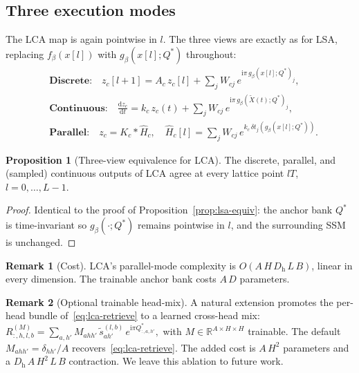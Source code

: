 \documentclass[11pt]{article}
\newcommand{\R}{\mathbb{R}}
\newcommand{\im}{\mathrm{i}}
\newcommand{\dd}{\mathrm{d}}
\newcommand{\nh}{H}              %
\newcommand{\Dh}{D_{\mathrm{h}}} %
\theoremstyle{definition}
\newtheorem{proposition}{Proposition}
\newtheorem{remark}{Remark}
\begin{document}
\subsection{Three execution modes}

The LCA map is again pointwise in $l$. The three views are exactly as
for LSA, replacing $f_\beta(x[l])$ with $g_\beta(x[l]; Q^{*})$
throughout:
\begin{align}
  &\textbf{Discrete:} \quad
    z_c[l+1] = A_c\,z_c[l] + \sum_j W_{cj}\,
      e^{\im\pi\,g_\beta(x[l]; Q^{*})_j},
       \label{eq:lca-discrete} \\
  &\textbf{Continuous:} \quad
    \frac{\dd z_c}{\dd t} = k_c\,z_c(t) + \sum_j W_{cj}\,
      e^{\im\pi\,g_\beta(\tilde X(t); Q^{*})_j},
       \label{eq:lca-continuous} \\
  &\textbf{Parallel:} \quad
    z_c = K_c * \hat H_c,
    \quad \hat H_c[l] = \sum_j W_{cj}\,
      e^{k_c\,\delta t_j(g_\beta(x[l]; Q^{*}))}.
       \label{eq:lca-parallel}
\end{align}

\begin{proposition}[Three-view equivalence for LCA]\label{prop:lca-equiv}
The discrete, parallel, and (sampled) continuous outputs of LCA agree
at every lattice point $l T$, $l = 0,\dots,L-1$.
\end{proposition}

\begin{proof}
Identical to the proof of Proposition~\ref{prop:lsa-equiv}: the anchor
bank $Q^{*}$ is time-invariant so $g_\beta(\cdot; Q^{*})$ remains
pointwise in $l$, and the surrounding SSM is unchanged.
\end{proof}

\begin{remark}[Cost]
LCA's parallel-mode complexity is $O(A\,\nh\,\Dh\,L\,B)$, linear in
every dimension. The trainable anchor bank costs $A\,D$ parameters.
\end{remark}

\begin{remark}[Optional trainable head-mix]\label{rem:lca-trainable-mix}
A natural extension promotes the per-head bundle
of~\eqref{eq:lca-retrieve} to a learned cross-head mix:
\(
  R^{(M)}_{:,h,l,b}
  = \sum_{a, h'} M_{a h h'}\,\tilde s_{a h'}^{(l,b)}\,e^{\im\pi Q^{*}_{:,a,h'}},
\)
with $M\in\R^{A\times \nh\times \nh}$ trainable. The default $M_{a h h'}
= \delta_{h h'}/A$ recovers~\eqref{eq:lca-retrieve}. The added cost is
$A\,\nh^2$ parameters and a $\Dh\,A\,\nh^2\,L\,B$ contraction. We leave
this ablation to future work.
\end{remark}
\end{document}
